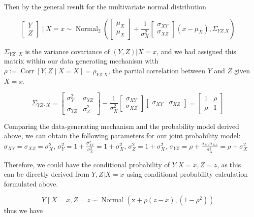 \documentclass[
]{book}
\begin{document}
Then by the general result for the multivariate normal distribution

\[
\left[\begin{array}{l}
Y \\
Z
\end{array}\right] \mid X=x \sim \operatorname{Normal}_2\left(\left[\begin{array}{l}
\mu_X \\
\mu_X
\end{array}\right]+\frac{1}{\sigma_X^2}\left[\begin{array}{l}
\sigma_{X Y} \\
\sigma_{X Z}
\end{array}\right]\left(x-\mu_X\right), \Sigma_{Y Z . X}\right)
\]

\(\Sigma_{Y Z \cdot X}\) is the variance covariance of \((Y,Z)|X=x\), and we had assigned this matrix within our data generating mechanism with \(\rho :=\operatorname{Corr}[Y, Z \mid X=X]=\rho_{Y Z . X}\), the partial correlation between \(Y\) and \(Z\) given \(X=x\).

\[
\Sigma_{Y Z \cdot X}=\left[\begin{array}{cc}
\sigma_Y^2 & \sigma_{Y Z} \\
\sigma_{Y Z} & \sigma_Z^2
\end{array}\right]-\frac{1}{\sigma_X^2}\left[\begin{array}{c}
\sigma_{X Y} \\
\sigma_{X Z}
\end{array}\right]\left[\begin{array}{ll}
\sigma_{X Y} & \sigma_{X Z}
\end{array}\right] = \left[\begin{array}{ll}
1 & \rho \\
\rho & 1
\end{array}\right]
\]

Comparing the data-generating mechanism and the probability model derived above, we can obtain the following parameters for our joint probability model: \(\sigma_{X Y}=\sigma_{X Z}=\sigma_X^2\), \(\sigma_Y^2 =1+\frac{\sigma_{X Y}^2}{\sigma_X^2}=1+\sigma_X^2\), \(\sigma_Z^2 =1+\sigma_X^2\), \(\sigma_{Y Z} =\rho+\frac{\sigma_{X Y} \sigma_{X Z}}{\sigma_X^2}=\rho+\sigma_X^2\)

Therefore, we could have the conditional probability of \(Y|X=x, Z=z\), as this can be directly derived from \(Y,Z|X=x\) using conditional probability calculation formulated above.

\[ Y \mid X=x, Z=z \sim \operatorname{Normal}\left(\mathrm{x}+\rho(z-x),\left(1-\rho^2\right)\right) \] thus we have
\end{document}
